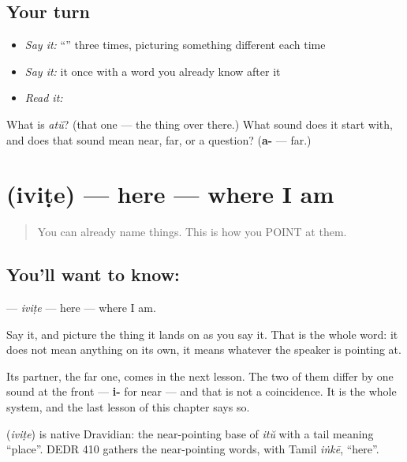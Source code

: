 \subsection*{Your turn}
\begin{itemize}
\raggedright
  \item \emph{Say it:} \textquotedblleft{}\textquotedblright{} three times, picturing something different each time
  \item \emph{Say it:} it once with a word you already know after it
  \item \emph{Read it:} \textbf{}
\end{itemize}

\begin{tcolorbox}[breakable,colback=teal!4,colframe=teal!35!black,title={Before you move on}]
What is \emph{atŭ}? (that one — the thing over there.) What sound does it start with, and does that sound mean near, far, or a question? (\textbf{a-} — far.)
\end{tcolorbox}
\section[\texorpdfstring{\ml{ഇവിടെ} (iviṭe)}{ഇവിടെ (iviṭe)}]{ (iviṭe) — here — where I am}

\label{lesson:ML-C41-here}



\begin{quote}
You can already name things. This is how you POINT at them.
\end{quote}

\subsection*{You'll want to know: }
\textbf{} — \emph{iviṭe} — here — where I am.

Say it, and picture the thing it lands on as you say it. That is the whole word: it does not mean anything on its own, it means whatever the speaker is pointing at.

Its partner, the far one, comes in the next lesson. The two of them differ by one sound at the front — \textbf{i-} for near — and that is not a coincidence. It is the whole system, and the last lesson of this chapter says so.

\begin{cousinweb}
\textbf{} (\emph{iviṭe}) is native Dravidian: the near-pointing base of \emph{itŭ} with a tail meaning \textquotedblleft{}place\textquotedblright{}. DEDR 410 gathers the near-pointing words, with Tamil \emph{iṅkē}, \textquotedblleft{}here\textquotedblright{}.
\end{cousinweb}

